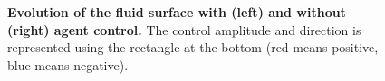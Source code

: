 \begin{figure}

\caption{\textbf{Evolution of the fluid surface with (left) and without (right) agent control.} The control amplitude and direction is represented using the rectangle at the bottom (red means positive, blue means negative).}
\label{fig:sloshing_fields}
\end{figure} 

